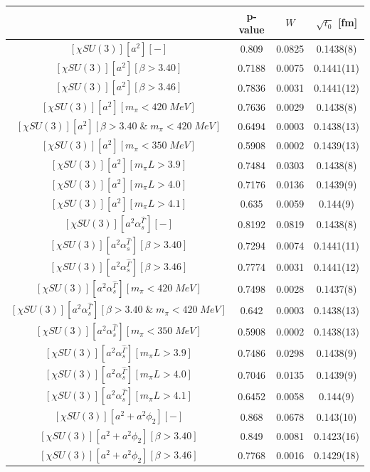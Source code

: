 \begin{longtable}{ c | c | c | c }
\toprule
 & p-value & $W$ & $\sqrt{t_0}$ [fm] \\
\midrule
$[\chi SU(3)][a^2][-]$ & 0.809 & 0.0825 & 0.1438(8) \\
$[\chi SU(3)][a^2][\beta>3.40]$ & 0.7188 & 0.0075 & 0.1441(11) \\
$[\chi SU(3)][a^2][\beta>3.46]$ & 0.7836 & 0.0031 & 0.1441(12) \\
$[\chi SU(3)][a^2][m_{\pi}<420\;MeV]$ & 0.7636 & 0.0029 & 0.1438(8) \\
$[\chi SU(3)][a^2][\beta>3.40\;\&\;m_{\pi}<420\;MeV]$ & 0.6494 & 0.0003 & 0.1438(13) \\
$[\chi SU(3)][a^2][m_{\pi}<350\;MeV]$ & 0.5908 & 0.0002 & 0.1439(13) \\
$[\chi SU(3)][a^2][m_{\pi}L>3.9]$ & 0.7484 & 0.0303 & 0.1438(8) \\
$[\chi SU(3)][a^2][m_{\pi}L>4.0]$ & 0.7176 & 0.0136 & 0.1439(9) \\
$[\chi SU(3)][a^2][m_{\pi}L>4.1]$ & 0.635 & 0.0059 & 0.144(9) \\
$[\chi SU(3)][a^2\alpha_s^{\hat{\Gamma}}][-]$ & 0.8192 & 0.0819 & 0.1438(8) \\
$[\chi SU(3)][a^2\alpha_s^{\hat{\Gamma}}][\beta>3.40]$ & 0.7294 & 0.0074 & 0.1441(11) \\
$[\chi SU(3)][a^2\alpha_s^{\hat{\Gamma}}][\beta>3.46]$ & 0.7774 & 0.0031 & 0.1441(12) \\
$[\chi SU(3)][a^2\alpha_s^{\hat{\Gamma}}][m_{\pi}<420\;MeV]$ & 0.7498 & 0.0028 & 0.1437(8) \\
$[\chi SU(3)][a^2\alpha_s^{\hat{\Gamma}}][\beta>3.40\;\&\;m_{\pi}<420\;MeV]$ & 0.642 & 0.0003 & 0.1438(13) \\
$[\chi SU(3)][a^2\alpha_s^{\hat{\Gamma}}][m_{\pi}<350\;MeV]$ & 0.5908 & 0.0002 & 0.1438(13) \\
$[\chi SU(3)][a^2\alpha_s^{\hat{\Gamma}}][m_{\pi}L>3.9]$ & 0.7486 & 0.0298 & 0.1438(9) \\
$[\chi SU(3)][a^2\alpha_s^{\hat{\Gamma}}][m_{\pi}L>4.0]$ & 0.7046 & 0.0135 & 0.1439(9) \\
$[\chi SU(3)][a^2\alpha_s^{\hat{\Gamma}}][m_{\pi}L>4.1]$ & 0.6452 & 0.0058 & 0.144(9) \\
$[\chi SU(3)][a^2+a^2\phi_2][-]$ & 0.868 & 0.0678 & 0.143(10) \\
$[\chi SU(3)][a^2+a^2\phi_2][\beta>3.40]$ & 0.849 & 0.0081 & 0.1423(16) \\
$[\chi SU(3)][a^2+a^2\phi_2][\beta>3.46]$ & 0.7768 & 0.0016 & 0.1429(18) \\

\end{longtable}
